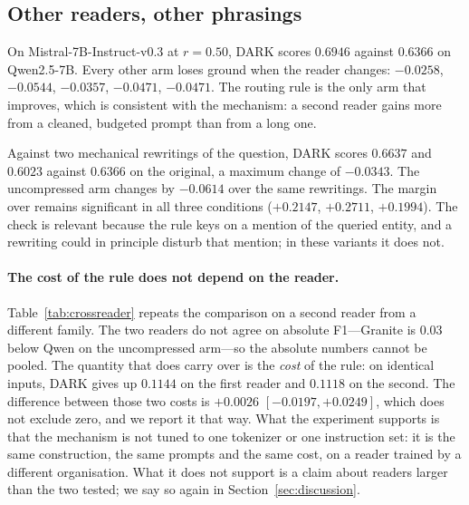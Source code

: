 \subsection{Other readers, other phrasings}

On Mistral-7B-Instruct-v0.3 at $r=0.50$, \textsc{DARK} scores $0.6946$ against $0.6366$
on Qwen2.5-7B. Every other arm loses ground when the reader changes:  $-0.0258$,
 $-0.0544$,  $-0.0357$,  $-0.0471$,
 $-0.0471$. The routing rule is the only arm that improves, which
is consistent with the mechanism: a second reader gains more from a cleaned, budgeted prompt
than from a long one.

Against two mechanical rewritings of the question, \textsc{DARK} scores $0.6637$ and
$0.6023$ against $0.6366$ on the original, a maximum change of $-0.0343$. The uncompressed
arm changes by $-0.0614$ over the same rewritings. The margin over
 remains significant in all three conditions ($+0.2147$, $+0.2711$,
$+0.1994$). The check is relevant because the rule keys on a mention of the queried entity,
and a rewriting could in principle disturb that mention; in these variants it does not.



\paragraph{The cost of the rule does not depend on the reader.}
Table~\ref{tab:crossreader} repeats the comparison on a second reader from a different family.
The two readers do not agree on absolute F1---Granite is $0.03$ below Qwen on the uncompressed
arm---so the absolute numbers cannot be pooled. The quantity that does carry over is the
\emph{cost} of the rule: on identical inputs, \textsc{DARK} gives up $0.1144$ on the first reader
and $0.1118$ on the second. The difference between those two costs is $+0.0026$
$[-0.0197,+0.0249]$, which does not exclude zero, and we report it that way. What the experiment
supports is that the mechanism is not tuned to one tokenizer or one instruction set: it is the
same construction, the same prompts and the same cost, on a reader trained by a different
organisation. What it does not support is a claim about readers larger than the two tested; we
say so again in Section~\ref{sec:discussion}.

